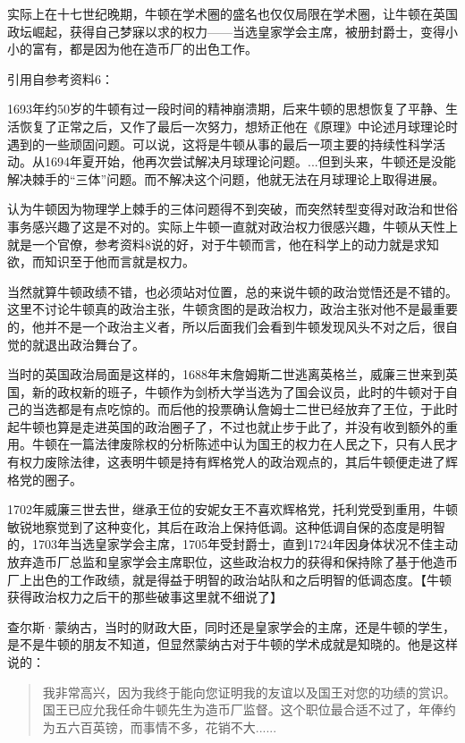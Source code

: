 \documentclass[12pt,oneside]{book}
\begin{document}
实际上在十七世纪晚期，牛顿在学术圈的盛名也仅仅局限在学术圈，让牛顿在英国政坛崛起，获得自己梦寐以求的权力——当选皇家学会主席，被册封爵士，变得小小的富有，都是因为他在造币厂的出色工作。

引用自参考资料6：
\begin{mdframed}
1693年约50岁的牛顿有过一段时间的精神崩溃期，后来牛顿的思想恢复了平静、生活恢复了正常之后，又作了最后一次努力，想矫正他在《原理》中论述月球理论时遇到的一些顽固问题。可以说，这将是牛顿从事的最后一项主要的持续性科学活动。从1694年夏开始，他再次尝试解决月球理论问题。...但到头来，牛顿还是没能解决棘手的“三体”问题。而不解决这个问题，他就无法在月球理论上取得进展。
\end{mdframed}

认为牛顿因为物理学上棘手的三体问题得不到突破，而突然转型变得对政治和世俗事务感兴趣了这是不对的。实际上牛顿一直就对政治权力很感兴趣，牛顿从天性上就是一个官僚，参考资料8说的好，对于牛顿而言，他在科学上的动力就是求知欲，而知识至于他而言就是权力。

当然就算牛顿政绩不错，也必须站对位置，总的来说牛顿的政治觉悟还是不错的。这里不讨论牛顿真的政治主张，牛顿贪图的是政治权力，政治主张对他不是最重要的，他并不是一个政治主义者，所以后面我们会看到牛顿发现风头不对之后，很自觉的就退出政治舞台了。

当时的英国政治局面是这样的，1688年末詹姆斯二世逃离英格兰，威廉三世来到英国，新的政权新的班子，牛顿作为剑桥大学当选为了国会议员，此时的牛顿对于自己的当选都是有点吃惊的。而后他的投票确认詹姆士二世已经放弃了王位，于此时起牛顿也算是走进英国的政治圈子了，不过也就止步于此了，并没有收到额外的重用。牛顿在一篇法律废除权的分析陈述中认为国王的权力在人民之下，只有人民才有权力废除法律，这表明牛顿是持有辉格党人的政治观点的，其后牛顿便走进了辉格党的圈子。

1702年威廉三世去世，继承王位的安妮女王不喜欢辉格党，托利党受到重用，牛顿敏锐地察觉到了这种变化，其后在政治上保持低调。这种低调自保的态度是明智的，1703年当选皇家学会主席，1705年受封爵士，直到1724年因身体状况不佳主动放弃造币厂总监和皇家学会主席职位，这些政治权力的获得和保持除了基于他造币厂上出色的工作政绩，就是得益于明智的政治站队和之后明智的低调态度。【牛顿获得政治权力之后干的那些破事这里就不细说了】

查尔斯·蒙纳古，当时的财政大臣，同时还是皇家学会的主席，还是牛顿的学生，是不是牛顿的朋友不知道，但显然蒙纳古对于牛顿的学术成就是知晓的。他是这样说的：

\begin{quotation}
我非常高兴，因为我终于能向您证明我的友谊以及国王对您的功绩的赏识。国王已应允我任命牛顿先生为造币厂监督。这个职位最合适不过了，年俸约为五六百英镑，而事情不多，花销不大......
\end{quotation}
\end{document}
